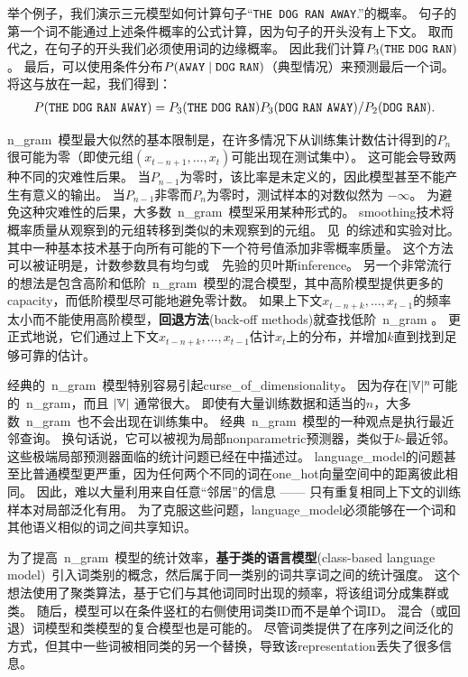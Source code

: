 举个例子，我们演示三元模型如何计算句子``{\tt THE DOG RAN AWAY}.''的概率。
句子的第一个词不能通过上述条件概率的公式计算，因为句子的开头没有上下文。
取而代之，在句子的开头我们必须使用词的边缘概率。
因此我们计算$P_3({\tt THE\ DOG\ RAN})$。
最后，可以使用条件分布$P({\tt AWAY} \mid {\tt DOG\ RAN})$（典型情况）来预测最后一个词。
将这与放在一起，我们得到：
\begin{align}
P({\tt THE\ DOG\ RAN\ AWAY}) = P_3({\tt THE\ DOG\ RAN}) P_3({\tt DOG\ RAN\ AWAY}) / P_2({\tt DOG\ RAN}).
\end{align}

\gls{n_gram}~模型最大似然的基本限制是，在许多情况下从训练集计数估计得到的$P_n$很可能为零（即使元组$(x_{t-n+1},  \dots, x_{t})$可能出现在测试集中）。
这可能会导致两种不同的灾难性后果。
当$P_{n-1}$为零时，该比率是未定义的，因此模型甚至不能产生有意义的输出。
当$P_{n-1}$非零而$P_n$为零时，测试样本的对数似然为 $-\infty$。
为避免这种灾难性的后果，大多数~\gls{n_gram}~模型采用某种形式的。
\gls{smoothing}技术将概率质量从观察到的元组转移到类似的未观察到的元组。
见~\citet{Chen+Goodman99}的综述和实验对比。
其中一种基本技术基于向所有可能的下一个符号值添加非零概率质量。
这个方法可以被证明是，计数参数具有均匀或~~先验的贝叶斯\gls{inference}。
另一个非常流行的想法是包含高阶和低阶~\gls{n_gram}~模型的混合模型，其中高阶模型提供更多的\gls{capacity}，而低阶模型尽可能地避免零计数。
如果上下文$x_{t-n+k}, \ldots, x_{t-1}$的频率太小而不能使用高阶模型，\textbf{回退方法}(back-off methods)就查找低阶~\gls{n_gram} 。
更正式地说，它们通过上下文$x_{t-n+k}, \ldots, x_{t-1}$估计$x_t$上的分布，并增加$k$直到找到足够可靠的估计。


经典的~\gls{n_gram}~模型特别容易引起\gls{curse_of_dimensionality}。
因为存在$|\mathbb{V}|^n$可能的~\gls{n_gram}，而且 $|\mathbb{V}|$ 通常很大。
即使有大量训练数据和适当的$n$，大多数~\gls{n_gram}~也不会出现在训练集中。
经典~\gls{n_gram}~模型的一种观点是执行最近邻查询。
换句话说，它可以被视为局部\gls{nonparametric}预测器，类似于$k$-最近邻。
这些极端局部预测器面临的统计问题已经在中描述过。
\gls{language_model}的问题甚至比普通模型更严重，因为任何两个不同的词在\gls{one_hot}向量空间中的距离彼此相同。
因此，难以大量利用来自任意``邻居''的信息 —— 只有重复相同上下文的训练样本对局部泛化有用。
为了克服这些问题，\gls{language_model}必须能够在一个词和其他语义相似的词之间共享知识。

为了提高~\gls{n_gram}~模型的统计效率，\textbf{基于类的语言模型}(class-based language model)~\citep{Brown92,Ney+Kneser93,Niesler98}引入词类别的概念，然后属于同一类别的词共享词之间的统计强度。
这个想法使用了聚类算法，基于它们与其他词同时出现的频率，将该组词分成集群或类。
随后，模型可以在条件竖杠的右侧使用词类ID而不是单个词ID。
混合（或回退）词模型和类模型的复合模型也是可能的。
尽管词类提供了在序列之间泛化的方式，但其中一些词被相同类的另一个替换，导致该\gls{representation}丢失了很多信息。

